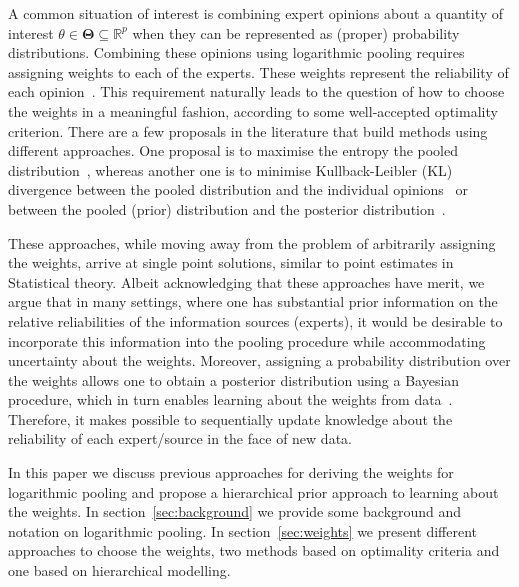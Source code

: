 \documentclass[a4paper, notitlepage, 10pt]{article}
\begin{document}
A common situation of interest is combining expert opinions about a quantity of interest $\theta \in \mathbf{\Theta} \subseteq \mathbb{R}^p$ when they can be represented as (proper) probability distributions.
Combining these opinions using logarithmic pooling requires assigning weights to each of the experts.
These weights represent the reliability of each opinion~\citep{genest1984}.
This requirement naturally leads to the question of how to choose the weights in a meaningful fashion, according to some well-accepted optimality criterion.
There are a few proposals in the literature that build methods using different approaches.
One proposal is to maximise the entropy the pooled distribution~\citep{myung1996}, whereas another one is to minimise Kullback-Leibler (KL) divergence between the pooled distribution and the individual opinions~\citep{abbas2009} or between the pooled (prior) distribution and the posterior distribution~\citep{rufo2012A,rufo2012B}.

These approaches, while moving away from the problem of arbitrarily assigning the weights, arrive at single point solutions, similar to point estimates in Statistical theory.
Albeit acknowledging that these approaches have merit, we argue that in many settings, where one has substantial prior information on the relative reliabilities of the information sources (experts), it would be desirable to incorporate this information into the pooling procedure while accommodating uncertainty about the weights.
Moreover, assigning a probability distribution over the weights allows one to obtain a posterior distribution using a Bayesian procedure, which in turn enables learning about the weights from data~\citep{poole2000}.
Therefore, it makes possible to sequentially update knowledge about the reliability of each expert/source in the face of new data.

In this paper we discuss previous approaches for deriving the weights for logarithmic pooling and propose a hierarchical prior approach to learning about the weights.
In section~\ref{sec:background} we provide some background and notation on logarithmic pooling.
In section~\ref{sec:weights} we present different approaches to choose the weights, two methods based on optimality criteria and one based on hierarchical modelling.
\end{document}
